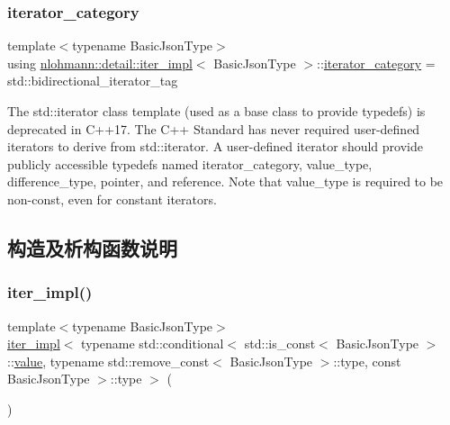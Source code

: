 \subsubsection{\texorpdfstring{iterator\_category}{iterator\_category}}
{\footnotesize\ttfamily template$<$typename Basic\+Json\+Type$>$ \\
using \mbox{\hyperlink{classnlohmann_1_1detail_1_1iter__impl}{nlohmann\+::detail\+::iter\+\_\+impl}}$<$ Basic\+Json\+Type $>$\+::\mbox{\hyperlink{classnlohmann_1_1detail_1_1iter__impl_ad9e091f5c70b34b5b1abc1ab15fd9106}{iterator\+\_\+category}} =  std\+::bidirectional\+\_\+iterator\+\_\+tag}

The std\+::iterator class template (used as a base class to provide typedefs) is deprecated in C++17. The C++ Standard has never required user-\/defined iterators to derive from std\+::iterator. A user-\/defined iterator should provide publicly accessible typedefs named iterator\+\_\+category, value\+\_\+type, difference\+\_\+type, pointer, and reference. Note that value\+\_\+type is required to be non-\/const, even for constant iterators. 

\subsection{构造及析构函数说明}
\mbox{\label{classnlohmann_1_1detail_1_1iter__impl_a19aa457f9c4af1b7e3af59839132cc5c}} 
\subsubsection{\texorpdfstring{iter\_impl()}{iter\_impl()}\hspace{0.1cm}{\footnotesize\ttfamily [1/4]}}
{\footnotesize\ttfamily template$<$typename Basic\+Json\+Type$>$ \\
\mbox{\hyperlink{classnlohmann_1_1detail_1_1iter__impl}{iter\+\_\+impl}}$<$ typename std\+::conditional$<$ std\+::is\+\_\+const$<$ Basic\+Json\+Type $>$\+::\mbox{\hyperlink{classnlohmann_1_1detail_1_1iter__impl_ab447c50354c6611fa2ae0100ac17845c}{value}}, typename std\+::remove\+\_\+const$<$ Basic\+Json\+Type $>$\+::type, const Basic\+Json\+Type $>$\+::type $>$ (\begin{DoxyParamCaption}{ }\end{DoxyParamCaption})\hspace{0.3cm}{\ttfamily [default]}}



